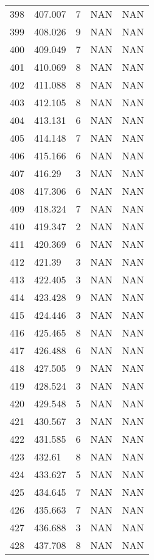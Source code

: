 \documentclass{article}
\begin{document}
\begin{longtable}{@{}lllll@{}}
				398 & 407.007 & 7     & NAN   & NAN   \\
				399 & 408.026 & 9     & NAN   & NAN   \\
				400 & 409.049 & 7     & NAN   & NAN   \\
				401 & 410.069 & 8     & NAN   & NAN   \\
				402 & 411.088 & 8     & NAN   & NAN   \\
				403 & 412.105 & 8     & NAN   & NAN   \\
				404 & 413.131 & 6     & NAN   & NAN   \\
				405 & 414.148 & 7     & NAN   & NAN   \\
				406 & 415.166 & 6     & NAN   & NAN   \\
				407 & 416.29  & 3     & NAN   & NAN   \\
				408 & 417.306 & 6     & NAN   & NAN   \\
				409 & 418.324 & 7     & NAN   & NAN   \\
				410 & 419.347 & 2     & NAN   & NAN   \\
				411 & 420.369 & 6     & NAN   & NAN   \\
				412 & 421.39  & 3     & NAN   & NAN   \\
				413 & 422.405 & 3     & NAN   & NAN   \\
				414 & 423.428 & 9     & NAN   & NAN   \\
				415 & 424.446 & 3     & NAN   & NAN   \\
				416 & 425.465 & 8     & NAN   & NAN   \\
				417 & 426.488 & 6     & NAN   & NAN   \\
				418 & 427.505 & 9     & NAN   & NAN   \\
				419 & 428.524 & 3     & NAN   & NAN   \\
				420 & 429.548 & 5     & NAN   & NAN   \\
				421 & 430.567 & 3     & NAN   & NAN   \\
				422 & 431.585 & 6     & NAN   & NAN   \\
				423 & 432.61  & 8     & NAN   & NAN   \\
				424 & 433.627 & 5     & NAN   & NAN   \\
				425 & 434.645 & 7     & NAN   & NAN   \\
				426 & 435.663 & 7     & NAN   & NAN   \\
				427 & 436.688 & 3     & NAN   & NAN   \\
				428 & 437.708 & 8     & NAN   & NAN   \\

\end{longtable}
\end{document}
